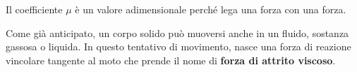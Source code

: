 \begin{figure}[htpb]
\end{figure}

Il coefficiente $\mu$ è un valore adimensionale perché lega una forza con una forza.

Come già anticipato, un corpo solido può muoversi anche in un fluido, sostanza gassosa o liquida. In questo tentativo di movimento, nasce una forza di reazione vincolare tangente al moto che prende il nome di \textbf{forza di attrito viscoso}.

